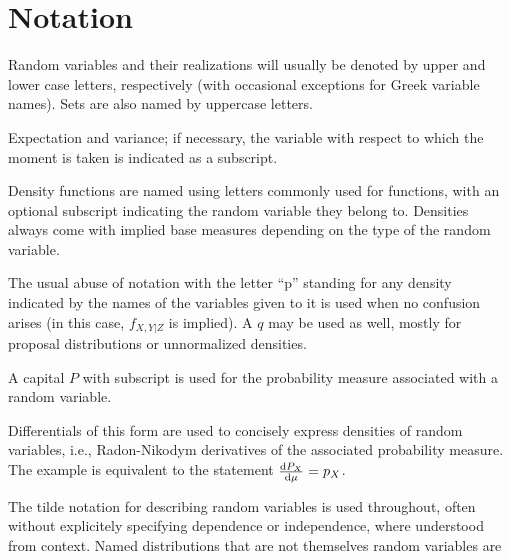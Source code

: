 \chapter*{Notation}
\label{cha:notation}

\begin{symbolicfootnotes}
  \begin{description}[style=nextline, leftmargin=4cm]
  \item[\(\Prob{\Theta \in A \given X = x}\)] Random variables and their realizations will usually be
    denoted by upper and lower case letters, respectively (with occasional exceptions for Greek
    variable names).  Sets are also named by uppercase letters.
  \item[{\(\Exp{X}, \Var[X]{f(X, Y)}\)}] Expectation and variance; if necessary, the variable with
    respect to which the moment is taken is indicated as a subscript.
  \item[\(\phi(x), f_{Z}(x)\)] Density functions are named using letters commonly used for functions,
    with an optional subscript indicating the random variable they belong to.  Densities always come
    with implied base measures depending on the type of the random variable.
  \item[\(\prob{x, y \given z}\)] The usual abuse of notation with the letter \enquote{p} standing for
    any density indicated by the names of the variables given to it is used when no confusion arises
    (in this case, \(f_{X,Y|Z}\) is implied).  A \(q\) may be used as well, mostly for proposal
    distributions or unnormalized densities.
  \item[{\(\Prob{X \in A} = P_{X}(A) = \int_{A} p_{X}(x) \dif\mu(x)\)}] A capital \(P\) with subscript
    is used for the probability measure associated with a random variable.
  \item[\(\Prob{X \in \dif x} = P_{X}(\dif x) = p_{X}(x) \dif\mu(x)\)] Differentials of this form
    are used to concisely express densities of random variables, i.e., Radon-Nikodym derivatives of
    the associated probability measure.  The example is equivalent to the statement
    \(\frac{\mathop{}\!\mathrm{d} P_{X}}{\mathop{}\!\mathrm{d} \mu} = p_{X}\).
  \item[{\(X_{i} \from \distr{Normal}(\mu, \sigma)\)}] The tilde notation for describing random
    variables is used throughout, often without explicitely specifying dependence or independence,
    where understood from context.  Named distributions that are not themselves random variables are

\end{description}
\end{symbolicfootnotes}
